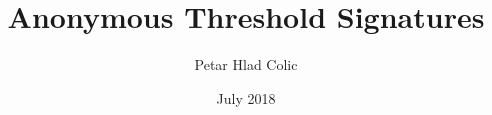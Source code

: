 \documentclass[envcountsect]{beamer}
\title{Anonymous Threshold Signatures}
\author{Petar Hlad Colic}
\institute{Universitat Polit\`ecnica de Catalunya \\ Facultat de Matem\`atiques i Estadistica}
\date{July 2018}
\begin{document}
    \frame{\titlepage}
    
    \frame{\tableofcontents}
    
    
    
    
    
    
    
    
    
    
    
    
\end{document}
